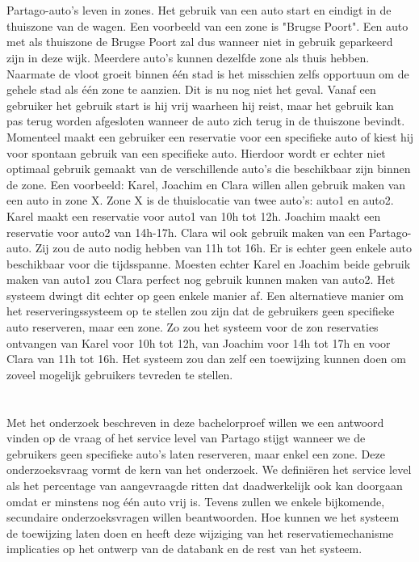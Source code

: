 \section{}
\label{sec:probleemstelling}
Partago-auto's leven in zones. Het gebruik van een auto start en eindigt in de thuiszone van de wagen. Een voorbeeld van een zone is "Brugse Poort". Een auto met als thuiszone de Brugse Poort zal dus wanneer niet in gebruik geparkeerd zijn in deze wijk. Meerdere auto's kunnen dezelfde zone als thuis hebben. Naarmate de vloot groeit binnen één stad is het misschien zelfs opportuun om de gehele stad als één zone te aanzien. Dit is nu nog niet het geval. Vanaf een gebruiker het gebruik start is hij vrij waarheen hij reist, maar het gebruik kan pas terug worden afgesloten wanneer de auto zich terug in de thuiszone bevindt. Momenteel maakt een gebruiker een reservatie voor een specifieke auto of kiest hij voor spontaan gebruik van een specifieke auto. Hierdoor wordt er echter niet optimaal gebruik gemaakt van de verschillende auto's die beschikbaar zijn binnen de zone. Een voorbeeld: Karel, Joachim en Clara willen allen gebruik maken van een auto in zone X. Zone X is de thuislocatie van twee auto's: auto1 en auto2. Karel maakt een reservatie voor auto1 van 10h tot 12h. Joachim maakt een reservatie voor auto2 van 14h-17h. Clara wil ook gebruik maken van een Partago-auto. Zij zou de auto nodig hebben van 11h tot 16h. Er is echter geen enkele auto beschikbaar voor die tijdsspanne. Moesten echter Karel en Joachim beide gebruik maken van auto1 zou Clara perfect nog gebruik kunnen maken van auto2. Het systeem dwingt dit echter op geen enkele manier af. Een alternatieve manier om het reserveringssysteem op te stellen zou zijn dat de gebruikers geen specifieke auto reserveren, maar een zone. Zo zou het systeem voor de zon reservaties ontvangen van Karel voor 10h tot 12h, van Joachim voor 14h tot 17h en voor Clara van 11h tot 16h. Het systeem zou dan zelf een toewijzing kunnen doen om zoveel mogelijk gebruikers tevreden te stellen.

\section{}
\label{sec:onderzoeksvraag}

Met het onderzoek beschreven in deze bachelorproef willen we een antwoord vinden op de vraag of het service level van Partago stijgt wanneer we de gebruikers geen specifieke auto's laten reserveren, maar enkel een zone. Deze onderzoeksvraag vormt de kern van het onderzoek. We definiëren het service level als het percentage van aangevraagde ritten dat daadwerkelijk ook kan doorgaan omdat er minstens nog één auto vrij is. Tevens zullen we enkele bijkomende, secundaire onderzoeksvragen willen beantwoorden. Hoe kunnen we het systeem de toewijzing laten doen en heeft deze wijziging van het reservatiemechanisme implicaties op het ontwerp van de databank en de rest van het systeem.

